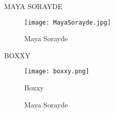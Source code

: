\documentclass{article}
\begin{document}
MAYA SORAYDE
\begin{figure}[h]		%
\centering
\texttt{[image: MayaSorayde.jpg]}
\caption{Maya Sorayde}			%
\label{fig:Maya}				%
\end{figure}
BOXXY
\begin{figure}[h]		%
\centering
\texttt{[image: boxxy.png]}
\caption{Boxxy}			%
\label{fig:Boxxy}				%
\end{figure}

\begin{figure}[h]		%
\centering
{}
\hspace{0.1\linewidth}

\hspace{0.1\linewidth}
\caption{Maya Sorayde}			%
\label{fig:Maya}				%
\end{figure}
\end{document}
